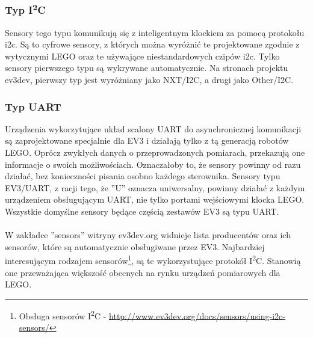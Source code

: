 \subsubsection{Typ I\textsuperscript{2}C}

Sensory tego typu komunikują się z inteligentnym klockiem za pomocą protokołu \Gls{i2c}. Są to cyfrowe sensory, z których można wyróżnić te projektowane zgodnie z wytycznymi LEGO oraz te używające niestandardowych czipów \Gls{i2c}. Tylko sensory pierwszego typu są wykrywane automatycznie. Na stronach projektu ev3dev, pierwszy typ jest wyróżniany jako NXT/I2C, a drugi jako Other/I2C.

\subsubsection{Typ UART}

Urządzenia wykorzytujące układ scalony UART do asynchronicznej komunikacji są zaprojektowane specjalnie dla EV3 i działają tylko z tą generacją robotów LEGO. Oprócz zwykłych danych o przeprowadzonych pomiarach, przekazują one informacje o swoich możliwościach. Oznaczałoby to, że sensory powinny od razu działać, bez konieczności pisania osobno każdego sterownika. Sensory typu EV3/UART, z racji tego, że ''U'' oznacza uniwersalny, powinny działać z każdym urządzeniem obsługującym UART, nie tylko portami wejściowymi klocka LEGO. Wszystkie domyślne sensory będące częścią zestawów EV3 są typu UART.\\\\

W zakładce ''sensors'' witryny ev3dev.org widnieje lista producentów oraz ich sensorów, które są automatycznie obsługiwane przez EV3. Najbardziej interesującym rodzajem sensorów\footnote{Obsługa sensorów I\textsuperscript{2}C - \url{http://www.ev3dev.org/docs/sensors/using-i2c-sensors/}}, są te wykorzystujące protokół I\textsuperscript{2}C. Stanowią one przeważająca większość obecnych na rynku urządzeń pomiarowych dla LEGO.

